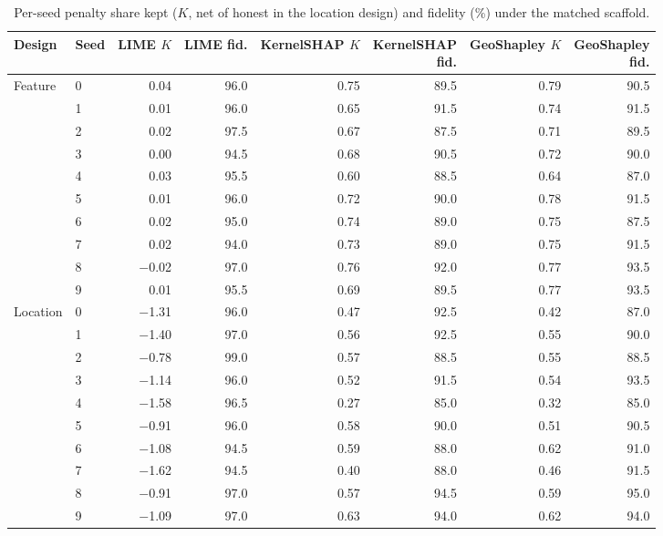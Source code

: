\begin{table}[t]
\centering
\footnotesize
\setlength{\tabcolsep}{3.5pt}
\begin{adjustbox}{max width=\linewidth}
\begin{tabular}{llrrrrrr}
\toprule
Design & Seed & LIME $K$ & LIME fid. & \makecell[b]{KernelSHAP \\ $K$} & \makecell[b]{KernelSHAP \\ fid.} & \makecell[b]{GeoShapley \\ $K$} & \makecell[b]{GeoShapley \\ fid.} \\
\midrule
Feature & 0 & 0.04 & 96.0 & 0.75 & 89.5 & 0.79 & 90.5 \\
 & 1 & 0.01 & 96.0 & 0.65 & 91.5 & 0.74 & 91.5 \\
 & 2 & 0.02 & 97.5 & 0.67 & 87.5 & 0.71 & 89.5 \\
 & 3 & 0.00 & 94.5 & 0.68 & 90.5 & 0.72 & 90.0 \\
 & 4 & 0.03 & 95.5 & 0.60 & 88.5 & 0.64 & 87.0 \\
 & 5 & 0.01 & 96.0 & 0.72 & 90.0 & 0.78 & 91.5 \\
 & 6 & 0.02 & 95.0 & 0.74 & 89.0 & 0.75 & 87.5 \\
 & 7 & 0.02 & 94.0 & 0.73 & 89.0 & 0.75 & 91.5 \\
 & 8 & $-$0.02 & 97.0 & 0.76 & 92.0 & 0.77 & 93.5 \\
 & 9 & 0.01 & 95.5 & 0.69 & 89.5 & 0.77 & 93.5 \\
\midrule
Location & 0 & $-$1.31 & 96.0 & 0.47 & 92.5 & 0.42 & 87.0 \\
 & 1 & $-$1.40 & 97.0 & 0.56 & 92.5 & 0.55 & 90.0 \\
 & 2 & $-$0.78 & 99.0 & 0.57 & 88.5 & 0.55 & 88.5 \\
 & 3 & $-$1.14 & 96.0 & 0.52 & 91.5 & 0.54 & 93.5 \\
 & 4 & $-$1.58 & 96.5 & 0.27 & 85.0 & 0.32 & 85.0 \\
 & 5 & $-$0.91 & 96.0 & 0.58 & 90.0 & 0.51 & 90.5 \\
 & 6 & $-$1.08 & 94.5 & 0.59 & 88.0 & 0.62 & 91.0 \\
 & 7 & $-$1.62 & 94.5 & 0.40 & 88.0 & 0.46 & 91.5 \\
 & 8 & $-$0.91 & 97.0 & 0.57 & 94.5 & 0.59 & 95.0 \\
 & 9 & $-$1.09 & 97.0 & 0.63 & 94.0 & 0.62 & 94.0 \\
\bottomrule
\end{tabular}
\end{adjustbox}
\caption{Per-seed penalty share kept ($K$, net of honest in the location design) and fidelity (\%) under the matched scaffold.}
\label{tab:perseed}
\end{table}
